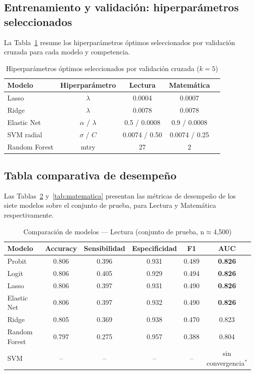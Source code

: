 \documentclass[11pt]{article}
\begin{document}
\subsection{Entrenamiento y validación: hiperparámetros seleccionados}

La Tabla~\ref{tab:hiperparam} resume los hiperparámetros óptimos
seleccionados por validación cruzada para cada modelo y competencia.

\begin{table}[h]
\centering
\small
\begin{tabular}{lcccc}
\toprule
\textbf{Modelo} & \textbf{Hiperparámetro} & \textbf{Lectura} & \textbf{Matemática} \\
\midrule
Lasso        & $\lambda$        & 0.0004 & 0.0007 \\
Ridge        & $\lambda$        & 0.0078 & 0.0078 \\
Elastic Net  & $\alpha$ / $\lambda$ & 0.5 / 0.0008 & 0.9 / 0.0008 \\
SVM radial   & $\sigma$ / $C$   & 0.0074 / 0.50 & 0.0074 / 0.25 \\
Random Forest & mtry            & 27     & 2      \\
\bottomrule
\end{tabular}
\caption{Hiperparámetros óptimos seleccionados por validación cruzada ($k=5$)}
\label{tab:hiperparam}
\end{table}

\subsection{Tabla comparativa de desempeño}

Las Tablas~\ref{tab:lectura} y~\ref{tab:matematica} presentan las
métricas de desempeño de los siete modelos sobre el conjunto de prueba,
para Lectura y Matemática respectivamente.

\begin{table}[h]
\centering
\small
\begin{tabular}{lccccc}
\toprule
\textbf{Modelo} & \textbf{Accuracy} & \textbf{Sensibilidad} & \textbf{Especificidad} & \textbf{F1} & \textbf{AUC} \\
\midrule
Probit       & 0.806 & 0.396 & 0.931 & 0.489 & \textbf{0.826} \\
Logit        & 0.806 & 0.405 & 0.929 & 0.494 & \textbf{0.826} \\
Lasso        & 0.806 & 0.397 & 0.931 & 0.490 & \textbf{0.826} \\
Elastic Net  & 0.806 & 0.397 & 0.932 & 0.490 & \textbf{0.826} \\
Ridge        & 0.805 & 0.369 & 0.938 & 0.470 & 0.823 \\
Random Forest & 0.797 & 0.275 & 0.957 & 0.388 & 0.804 \\
SVM          & --    & --    & --    & --    & sin convergencia$^{*}$ \\
\bottomrule
\end{tabular}
\caption{Comparación de modelos --- Lectura (conjunto de prueba, n$\approx$4{,}500)}
\label{tab:lectura}
\end{table}
\end{document}
